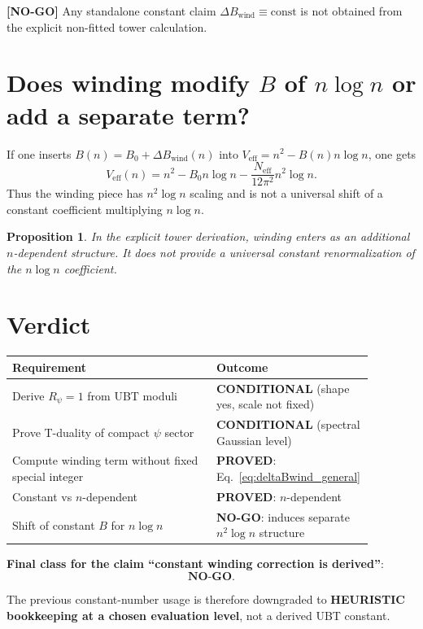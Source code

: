 \documentclass[11pt,a4paper]{article}
\newtheorem{proposition}{Proposition}
\newcommand{\nogo}[1]{\textbf{[NO-GO]} #1}
\begin{document}
\nogo{Any standalone constant claim $\Delta B_{\mathrm{wind}}\equiv\text{const}$ is not
obtained from the explicit non-fitted tower calculation.}

\section{Does winding modify $B$ of $n\log n$ or add a separate term?}

If one inserts $B(n)=B_0+\Delta B_{\mathrm{wind}}(n)$ into
$V_{\mathrm{eff}}=n^2-B(n)n\log n$, one gets
\begin{equation}
V_{\mathrm{eff}}(n)
=n^2-B_0n\log n
-\frac{N_{\mathrm{eff}}}{12\pi^2}n^2\log n.
\end{equation}
Thus the winding piece has $n^2\log n$ scaling and is not a universal shift of a
constant coefficient multiplying $n\log n$.

\begin{proposition}
In the explicit tower derivation, winding enters as an additional
$n$-dependent structure. It does not provide a universal constant renormalization
of the $n\log n$ coefficient.
\end{proposition}

\section{Verdict}

\begin{center}
\begin{tabular}{p{0.56\linewidth}p{0.32\linewidth}}
\toprule
Requirement & Outcome \\
\midrule
Derive $R_{\psi}=1$ from UBT moduli & \textbf{CONDITIONAL} (shape yes, scale not fixed) \\
Prove T-duality of compact $\psi$ sector & \textbf{CONDITIONAL} (spectral Gaussian level) \\
Compute winding term without fixed special integer & \textbf{PROVED}: Eq.\ \eqref{eq:deltaBwind_general} \\
Constant vs $n$-dependent & \textbf{PROVED}: $n$-dependent \\
Shift of constant $B$ for $n\log n$ & \textbf{NO-GO}: induces separate $n^2\log n$ structure \\
\bottomrule
\end{tabular}
\end{center}

\bigskip
\noindent\textbf{Final class for the claim ``constant winding correction is derived''}:\
\begin{equation}
\boxed{\textbf{NO-GO}}.
\end{equation}

\noindent The previous constant-number usage is therefore downgraded to
\textbf{HEURISTIC bookkeeping at a chosen evaluation level}, not a derived UBT
constant.
\end{document}
